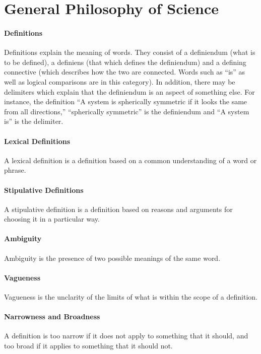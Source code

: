 \section{General Philosophy of Science}

\paragraph{Definitions}
Definitions explain the meaning of words. They consist of a definiendum (what is to be defined), a definiens (that which defines the definiendum) and a defining connective (which describes how the two are connected. Words such as ``is'' as well as logical comparisons are in this category). In addition, there may be delimiters which explain that the definiendum is an aspect of something else. For instance, the definition ``A system is spherically symmetric if it looks the same from all directions,'' ``spherically symmetric'' is the definiendum and ``A system is'' is the delimiter.

\paragraph{Lexical Definitions}
A lexical definition is a definition based on a common understanding of a word or phrase.

\paragraph{Stipulative Definitions}
A stipulative definition is a definition based on reasons and arguments for choosing it in a particular way.

\paragraph{Ambiguity}
Ambiguity is the presence of two possible meanings of the same word.

\paragraph{Vagueness}
Vagueness is the unclarity of the limits of what is within the scope of a definition.

\paragraph{Narrowness and Broadness}
A definition is too narrow if it does not apply to something that it should, and too broad if it applies to something that it should not.

